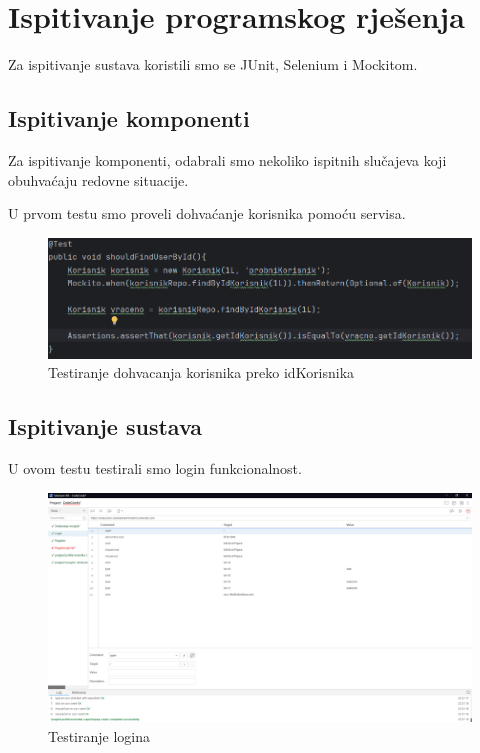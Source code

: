 	
		\section{Ispitivanje programskog rješenja}
			
			\noindent Za ispitivanje sustava koristili smo se JUnit, Selenium i Mockitom.
			
			\subsection{Ispitivanje komponenti}
			
			Za ispitivanje komponenti, odabrali smo nekoliko ispitnih slučajeva koji obuhvaćaju redovne situacije.
			
			U prvom testu smo proveli dohvaćanje korisnika pomoću servisa.
			\begin{figure}[H]
				\includegraphics[scale= 0.5]{slike/dohvacanjeKorisnika.png}
				\centering
				\caption{Testiranje dohvacanja korisnika preko idKorisnika}
				\label{fig:TestDohvacanjeKorisnika}
			\end{figure}
			
			\subsection{Ispitivanje sustava}
			
			U ovom testu testirali smo login funkcionalnost.
			
			\begin{figure}[H]
				\includegraphics[scale= 0.25]{slike/test1.png}
				\centering
				\caption{Testiranje logina}
				\label{fig:Test1}
			\end{figure}
			
